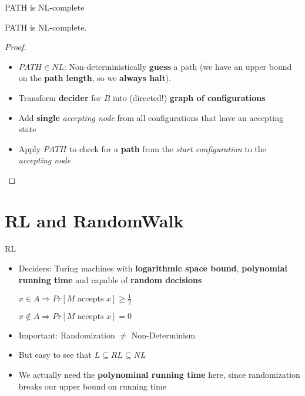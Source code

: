 \begin{frame}{PATH is NL-complete}

\begin{theorem}
    PATH is NL-complete.
\end{theorem}

\begin{proof}
\begin{itemize}
    \item $PATH \in NL$: Non-deterministically \textbf{guess} a path (we have an upper bound on the \textbf{path length}, so we \textbf{always halt}).
    \item Transform \textbf{decider} for $B$ into (directed!) \textbf{graph of configurations}
    \item Add \textbf{single} \textit{accepting node} from all configurations that have an accepting state
    \item Apply $PATH$ to check for a \textbf{path} from the \textit{start configuration} to the \textit{accepting node}
\end{itemize}
\end{proof}

\end{frame}

\section{RL and RandomWalk}\label{rl-and-randomwalk}

\begin{frame}{RL}

\begin{itemize}
\item
  Deciders: Turing machines with \textbf{logarithmic space bound},
  \textbf{polynomial running time} and capable of \textbf{random
  decisions}

  $x \in A \Rightarrow Pr[M \text{ accepts } x] \geq \frac{1}{2}$

  $x \not \in A \Rightarrow Pr[M \text{ accepts } x] = 0$
\item
  Important: Randomization $\not =$ Non-Determinism
\item
  But easy to see that $L \subseteq RL \subseteq NL$
\item
  We actually need the \textbf{polynominal running time} here, since
  randomization breaks our upper bound on running time
\end{itemize}

\end{frame}

